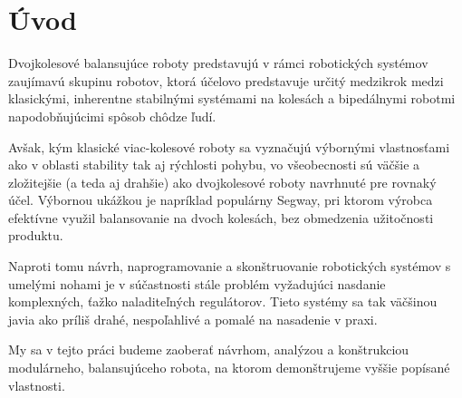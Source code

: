 \chapter{Úvod}

Dvojkolesové balansujúce roboty predstavujú v rámci robotických systémov zaujímavú skupinu robotov, ktorá účelovo predstavuje určitý medzikrok medzi klasickými, inherentne stabilnými systémami na kolesách a bipedálnymi robotmi napodobňujúcimi spôsob chôdze ľudí.
 
Avšak, kým klasické viac-kolesové roboty sa vyznačujú výbornými vlastnosťami ako v oblasti stability tak aj rýchlosti pohybu, vo všeobecnosti sú väčšie a zložitejšie (a teda aj drahšie) ako dvojkolesové roboty navrhnuté pre rovnaký účel. Výbornou ukážkou je napríklad populárny Segway, pri ktorom výrobca efektívne využil balansovanie na dvoch kolesách, bez obmedzenia užitočnosti produktu.   

Naproti tomu návrh, naprogramovanie a skonštruovanie robotických systémov s umelými nohami je v súčastnosti stále problém vyžadujúci nasdanie komplexných, ťažko naladiteľných regulátorov. Tieto systémy sa tak väčšinou javia ako príliš drahé, nespoľahlivé a pomalé na nasadenie v praxi. 

My sa v tejto práci budeme zaoberať návrhom, analýzou a konštrukciou modulárneho, balansujúceho robota, na ktorom demonštrujeme vyššie popísané vlastnosti.  
